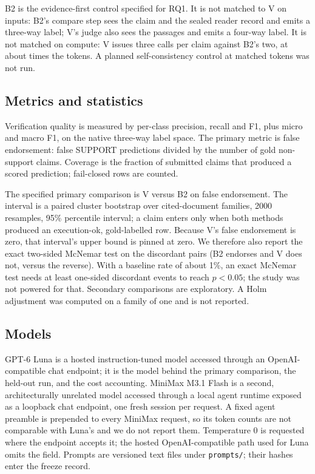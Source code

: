 \documentclass[11pt,a4paper]{article}
\begin{document}
B2 is the evidence-first control specified for RQ1. It is not matched to
V on inputs: B2's compare step sees the claim and the sealed reader
record and emits a three-way label; V's judge also sees the passages and
emits a four-way label. It is not matched on compute: V issues three
calls per claim against B2's two, at about \lunaTokenRatio{} times the
tokens. A planned self-consistency control at matched tokens was not
run.

\subsection{Metrics and statistics}

Verification quality is measured by per-class precision, recall and F1,
plus micro and macro F1, on the native three-way label space. The
primary metric is false endorsement: false SUPPORT predictions divided
by the number of gold non-support claims. Coverage is the fraction of
submitted claims that produced a scored prediction; fail-closed rows are
counted.

The specified primary comparison is V versus B2 on false endorsement.
The interval is a paired cluster bootstrap over cited-document families,
2000 resamples, 95\% percentile interval; a claim enters only when both
methods produced an execution-ok, gold-labelled row. Because V's false
endorsement is zero, that interval's upper bound is pinned at zero. We
therefore also report the exact two-sided McNemar test on the discordant
pairs (B2 endorses and V does not, versus the reverse). With a baseline
rate of about 1\%, an exact McNemar test needs at least
\feMinDiscordant{} one-sided discordant events to reach $p<0.05$; the
study was not powered for that. Secondary comparisons are exploratory.
A Holm adjustment was computed on a family of one and is not reported.

\subsection{Models}

GPT-6 Luna is a hosted instruction-tuned model accessed through an
OpenAI-compatible chat endpoint; it is the model behind the primary
comparison, the held-out run, and the cost accounting. MiniMax M3.1
Flash is a second, architecturally unrelated model accessed through a
local agent runtime exposed as a loopback chat endpoint, one fresh
session per request. A fixed agent preamble is prepended to every MiniMax
request, so its token counts are not comparable with Luna's and we do
not report them. Temperature $0$ is requested where the endpoint accepts
it; the hosted OpenAI-compatible path used for Luna omits the field.
Prompts are versioned text files under \texttt{prompts/}; their hashes
enter the freeze record.
\end{document}
